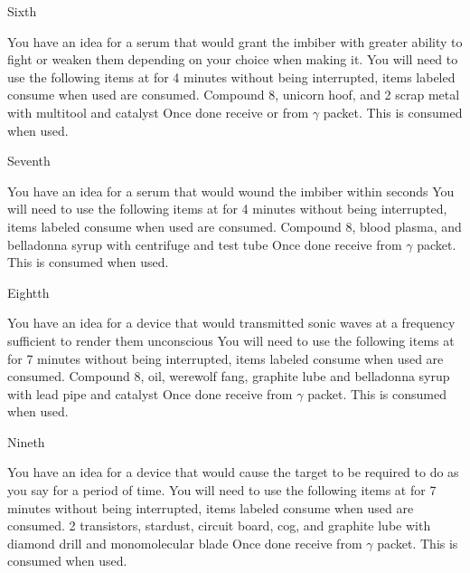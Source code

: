 \documentclass[greennotebook]{guildcamp3} %
\begin{document}
\begin{page}{Sixth}
	
	You have an idea for a serum that would grant the imbiber with greater ability to fight or weaken them depending on your choice when making it.
	You will need to use the following items at \sSciWorkbench{} for 4 minutes without being interrupted, items labeled consume when used are consumed.
	Compound 8, unicorn hoof, and 2 scrap metal with multitool and catalyst
	Once done receive \iCRUpSerum{} or \iCRDownSerum{} from $\gamma$ packet. This is consumed when used. 
	
\end{page}

\begin{page}{Seventh}
	
	You have an idea for a serum that would wound the imbiber within seconds
	You will need to use the following items at \sSciWorkbench{} for 4 minutes without being interrupted, items labeled consume when used are consumed.
	Compound 8, blood plasma, and belladonna syrup with centrifuge and test tube
	Once done receive \iTechPoison{} from $\gamma$ packet. This is consumed when used. 
	
\end{page}

\begin{page}{Eightth}
	
	You have an idea for a device that would transmitted sonic waves at a frequency sufficient to render them unconscious
	You will need to use the following items at \sSciWorkbench{} for 7 minutes without being interrupted, items labeled consume when used are consumed.
	Compound 8, oil, werewolf fang, graphite lube and belladonna syrup with lead pipe and catalyst
	Once done receive \iSonicKO{} from $\gamma$ packet. This is consumed when used. 
	
\end{page}

\begin{page}{Nineth}
	
	You have an idea for a device that would cause the target to be required to do as you say for a period of time.
	You will need to use the following items at \sSciWorkbench{} for 7 minutes without being interrupted, items labeled consume when used are consumed.
	2 transistors, stardust, circuit board, cog, and graphite lube with diamond drill and monomolecular blade
	Once done receive \iMCDevice{} from $\gamma$ packet. This is consumed when used. 
	
\end{page}
\end{document}
